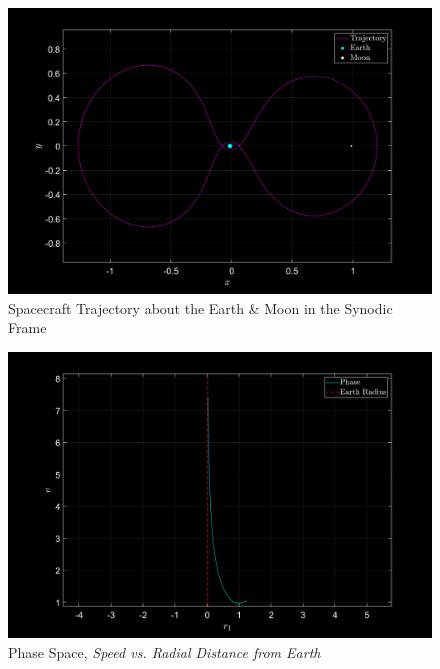 \documentclass{article}
\begin{document}
\begin{figure}[h]
    \centering
    \includegraphics[width=\textwidth]{fig/trajectory1.png}
    \caption{Spacecraft Trajectory about the Earth \& Moon in the Synodic Frame}
    \label{fig1}
\end{figure}

\pagebreak

\begin{figure}[!h]
    \centering
    \includegraphics[width=\textwidth]{fig/phase1.png}
    \caption{Phase Space, \textit{Speed vs. Radial Distance from Earth}}
    \label{fig2}
\end{figure}
\end{document}
